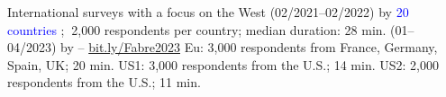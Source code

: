 \documentclass[aspectratio=169,xcolor=dvipsnames, 11pt,mathserif]{beamer}
\begin{document}
\begin{frame}{International surveys with a focus on the West\label{questionnaires}}
    \bbvs
    \ip {}  (02/2021--02/2022) by  
    \bbvs \ip \textcolor{blue}{20 countries}%
    ; $~$2,000 respondents per country; median duration: 28 min. \ee
    \ip {} (01--04/2023) by  -- \href{https://bit.ly/Fabre2023}{bit.ly/Fabre2023}
    \bbvs \ip Eu: 3,000 respondents from France, Germany, Spain, UK; 20 min. 
    \ip US1: 3,000 respondents from the U.S.; 14 min. 
    \ip US2: 2,000 respondents from the U.S.; 11 min.
    \ee 
    \ee \vspace*{-.2cm}
\end{frame}


\end{document}
